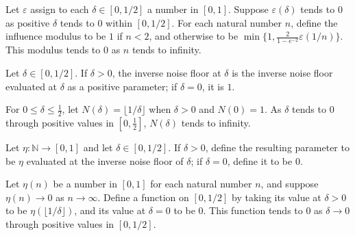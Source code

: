 \begin{theorem}
\label{FABL.tendsto_influenceModulusOfNoiseModulus}
\leanok
{}
Let $\varepsilon$ assign to each $\delta\in[0,1/2]$ a number in $[0,1]$. Suppose
$\varepsilon(\delta)$ tends to $0$ as positive $\delta$ tends to $0$ within $[0,1/2]$.
For each natural number $n$, define the influence modulus to be $1$ if $n<2$, and
otherwise to be $\min\{1,\frac{2}{1-e^{-2}}\varepsilon(1/n)\}$. This modulus tends to
$0$ as $n$ tends to infinity.
\end{theorem}

\begin{definition}
\label{FABL.inverseNoiseFloorAtZero}
\leanok
{}
Let $\delta\in[0,1/2]$. If $\delta>0$, the inverse noise floor at $\delta$ is the
inverse noise floor evaluated at $\delta$ as a positive parameter; if $\delta=0$, it is
$1$.
\end{definition}

\begin{theorem}
\label{FABL.tendsto_inverseNoiseFloorAtZero}
\leanok
{}
For $0\leq\delta\leq\tfrac12$, let $N(\delta)=\lfloor 1/\delta\rfloor$ when $\delta>0$
and $N(0)=1$. As $\delta$ tends to $0$ through positive values in $[0,\tfrac12]$,
$N(\delta)$ tends to infinity.
\end{theorem}

\begin{definition}
\label{FABL.noiseModulusOfInfluenceModulus}
\leanok
{}
Let $\eta:\mathbb N\to[0,1]$ and let $\delta\in[0,1/2]$. If $\delta>0$, define the
resulting parameter to be $\eta$ evaluated at the inverse noise floor of $\delta$; if
$\delta=0$, define it to be $0$.
\end{definition}

\begin{theorem}
\label{FABL.tendsto_noiseModulusOfInfluenceModulus}
\leanok
{}
Let $\eta(n)$ be a number in $[0,1]$ for each natural number $n$, and suppose
$\eta(n)\to 0$ as $n\to\infty$. Define a function on $[0,1/2]$ by taking its value at
$\delta>0$ to be $\eta(\lfloor1/\delta\rfloor)$, and its value at $\delta=0$ to be $0$.
This function tends to $0$ as $\delta\to0$ through positive values in $[0,1/2]$.
\end{theorem}

